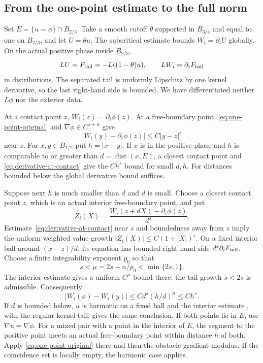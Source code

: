 \documentclass[11pt]{article}
\numberwithin{equation}{section}
\newcommand{\dist}{\operatorname{dist}}
\begin{document}
\subsection{From the one-point estimate to the full norm}

Set $E=\{u=\phi\}\cap B_{2/3}$. Take a smooth cutoff $\theta$ supported
in $B_{3/4}$ and equal to one on $B_{2/3}$, and let $U=\theta u$.
The subcritical estimate bounds $W_i=\partial_iU$ globally. On the actual
positive phase inside $B_{2/3}$,
\begin{equation}\label{eq:derivative-equation}
 LU=F_{\rm tail}=-L((1-\theta)u),\qquad
                         LW_i=\partial_iF_{\rm tail}
\end{equation}
in distributions. The separated tail is uniformly Lipschitz by one kernel
derivative, so the last right-hand side is bounded. We have differentiated
neither $L\phi$ nor the exterior data.

At a contact point $z$, $W_i(z)=\partial_i\phi(z)$. At a free-boundary
point, \eqref{eq:one-point-original} and
$\nabla\phi\in C^{s+\alpha}$ give
\begin{equation}\label{eq:derivative-at-contact}
          |W_i(y)-\partial_i\phi(z)|\leq C|y-z|^s
\end{equation}
near $z$. For $x,y\in B_{1/2}$ put $h=|x-y|$. If $x$ is in the positive
phase and $h$ is comparable to or greater than $d=\dist(x,E)$, a closest
contact point and \eqref{eq:derivative-at-contact} give the $Ch^s$ bound
for small $d,h$. For distances bounded below the global derivative bound
suffices.

Suppose next $h$ is much smaller than $d$ and $d$ is small. Choose a
closest contact point $z$, which is an actual interior free-boundary point,
and put
\[
                  Z_i(X)=\frac{W_i(z+dX)-\partial_i\phi(z)}{d^s}.
\]
Estimate~\eqref{eq:derivative-at-contact} near $z$ and boundedness away
from $z$ imply the uniform weighted value growth
$|Z_i(X)|\leq C(1+|X|)^s$. On a fixed interior ball around $(x-z)/d$,
its equation has bounded right-hand side $d^s\partial_iF_{\rm tail}$.
Choose a finite integrability exponent $p_0$ so that
\[
                   s<\mu=2s-n/p_0<\min\{2s,1\}.
\]
The interior estimate \cite[Theorem 2.4.3]{FRRO} gives a uniform $C^\mu$
bound there; the tail growth $s<2s$ is admissible. Consequently
\[
       |W_i(x)-W_i(y)|\leq Cd^s(h/d)^\mu\leq Ch^s.
\]
If $d$ is bounded below, $u$ is harmonic on a fixed ball and the interior
estimate \cite[Theorem 2.4.1]{FRRO}, with the regular kernel tail, gives
the same conclusion. If both points lie in $E$, use
$\nabla u=\nabla\phi$. For a mixed pair with a point in the interior of
$E$, the segment to the positive point meets an actual free-boundary point
within distance $h$ of both. Apply \eqref{eq:one-point-original} there
and then the obstacle-gradient modulus. If the coincidence set is locally
empty, the harmonic case applies.
\end{document}
